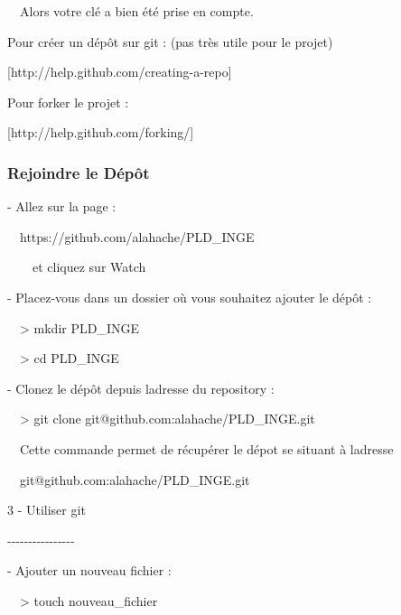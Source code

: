 \documentclass{mise_en_page}
\begin{document}
\ \ Alors votre clé a bien été prise en compte.







Pour créer un dépôt sur git : (pas très utile pour le projet)

[http://help.github.com/creating-a-repo]




Pour forker le projet :

[http://help.github.com/forking/]




\subsubsection{Rejoindre le Dépôt}



{}- Allez sur la page :

\ \ https://github.com/alahache/PLD\_INGE

\ \ \ \ et cliquez sur {\textquotedbl}Watch{\textquotedbl}







{}- Placez-vous dans un dossier où vous souhaitez ajouter le dépôt :

\ \ {\textgreater} mkdir PLD\_INGE

\ \ {\textgreater} cd PLD\_INGE







{}- Clonez le dépôt depuis l{\textquotesingle}adresse du repository :

\ \ {\textgreater} git clone git@github.com:alahache/PLD\_INGE.git




\ \ Cette commande permet de récupérer le dépot se situant à
l{\textquotesingle}adresse

\ \ git@github.com:alahache/PLD\_INGE.git










3 - Utiliser git

{}-{}-{}-{}-{}-{}-{}-{}-{}-{}-{}-{}-{}-{}-{}-{}-




{}- Ajouter un nouveau fichier :

\ \ {\textgreater} touch nouveau\_fichier
\end{document}
